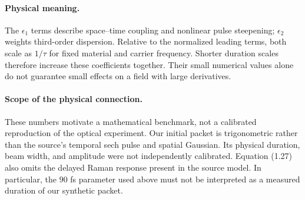 \paragraph{Physical meaning.}
The $\epsilon_1$ terms describe space--time coupling and nonlinear pulse steepening; $\epsilon_2$ weights third-order dispersion. Relative to the normalized leading terms, both scale as $1/\tau$ for fixed material and carrier frequency. Shorter duration scales therefore increase these coefficients together. Their small numerical values alone do not guarantee small effects on a field with large derivatives.

\paragraph{Scope of the physical connection.}
These numbers motivate a mathematical benchmark, not a calibrated reproduction of the optical experiment. Our initial packet is trigonometric rather than the source's temporal sech pulse and spatial Gaussian. Its physical duration, beam width, and amplitude were not independently calibrated. Equation (1.27) also omits the delayed Raman response present in the source model. In particular, the $90$ fs parameter used above must not be interpreted as a measured duration of our synthetic packet.
